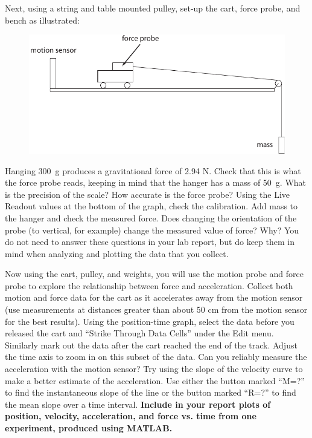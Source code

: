 \documentclass[11pt,letterpaper]{article}
\newcounter{question}[section]
\begin{document}
Next, using a string and table mounted pulley, set-up the cart, force probe, and bench as illustrated:

\begin{figure}[h]
\begin{center}
\includegraphics[]{./cart_and_pulley}
\end{center}
\end{figure}


Hanging 300~g produces a gravitational force of 2.94 N.  Check that this is what the force probe reads, keeping in mind that the hanger has a mass of 50~g.  What is the precision of the scale? How accurate is the force probe?  Using the Live Readout values at the bottom of the graph, check the calibration. Add mass to the hanger and check the measured force.  Does changing the orientation of the probe (to vertical, for example) change the measured value of force? Why? You do not need to answer these questions in your lab report, but do keep them in mind when analyzing and plotting the data that you collect.

Now using the cart, pulley, and weights, you will use the motion probe and force probe to explore the relationship between force and acceleration. Collect both motion and force data for the cart as it accelerates away from the motion sensor (use measurements at distances greater than about 50 cm from the motion sensor for the best results).  Using the position-time graph, select the data before you released the cart and ``Strike Through Data Cells'' under the Edit menu.  Similarly mark out the data after the cart reached the end of the track.  Adjust the time axis to zoom in on this subset of the data.  Can you reliably measure the acceleration with the motion sensor?  Try using the slope of the velocity curve to make a better estimate of the
acceleration. Use either the button marked ``M=?'' to find the instantaneous slope of the line or the button marked ``R=?'' to find the mean slope over a time interval. \textbf{Include in your report plots of position, velocity, acceleration, and force vs. time from one experiment, produced using MATLAB.}%
\end{document}

